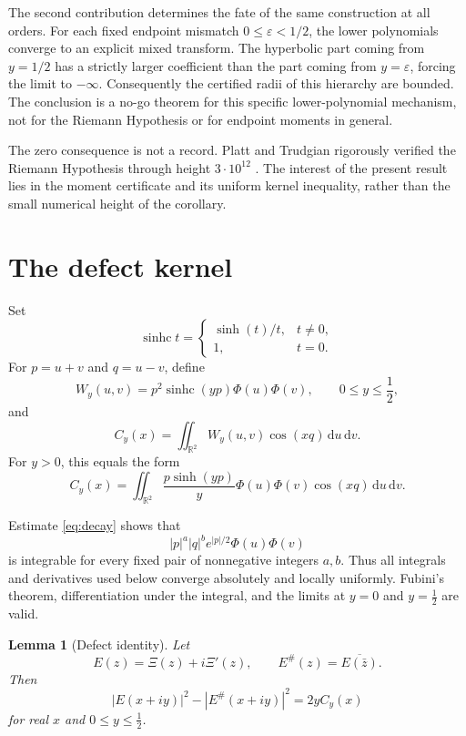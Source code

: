 \documentclass[11pt]{amsart}
\newtheorem{lemma}[theorem]{Lemma}
\theoremstyle{remark}
\newcommand{\sinhc}{\operatorname{sinhc}}
\newcommand{\R}{\mathbb{R}}
\newcommand{\dd}{\,\mathrm{d}}
\begin{document}
The second contribution determines the fate of the same construction at all
orders.  For each fixed endpoint mismatch $0\leq\varepsilon<1/2$, the lower
polynomials converge to an explicit mixed transform.  The hyperbolic part
coming from $y=1/2$ has a strictly larger coefficient than the part coming
from $y=\varepsilon$, forcing the limit to $-\infty$.  Consequently the
certified radii of this hierarchy are bounded.  The conclusion is a no-go
theorem for this specific lower-polynomial mechanism, not for the Riemann
Hypothesis or for endpoint moments in general.

The zero consequence is not a record.  Platt and Trudgian rigorously verified
the Riemann Hypothesis through height $3\cdot10^{12}$ \cite{PT2021}.  The
interest of the present result lies in the moment certificate and its uniform
kernel inequality, rather than the small numerical height of the corollary.

\section{The defect kernel}

Set
\[
\sinhc t=
\begin{cases}
\sinh(t)/t,&t\neq0,\\
1,&t=0.
\end{cases}
\]
For $p=u+v$ and $q=u-v$, define
\begin{equation}\label{eq:W}
W_y(u,v)=p^2\sinhc(yp)\Phi(u)\Phi(v),
\qquad 0\leq y\leq\frac12,
\end{equation}
and
\begin{equation}\label{eq:C}
C_y(x)=\iint_{\R^2}W_y(u,v)\cos(xq)\dd u\dd v.
\end{equation}
For $y>0$, this equals the form
\[
C_y(x)=\iint_{\R^2}
\frac{p\sinh(yp)}{y}\Phi(u)\Phi(v)\cos(xq)\dd u\dd v.
\]

Estimate \eqref{eq:decay} shows that
\[
|p|^a|q|^b e^{|p|/2}\Phi(u)\Phi(v)
\]
is integrable for every fixed pair of nonnegative integers $a,b$.  Thus all
integrals and derivatives used below converge absolutely and locally
uniformly.  Fubini's theorem, differentiation under the integral, and the
limits at $y=0$ and $y=\frac12$ are valid.

\begin{lemma}[Defect identity]\label{lem:defect}
Let
\[
E(z)=\Xi(z)+i\Xi'(z),
\qquad
E^{\#}(z)=\overline{E(\bar z)}.
\]
Then
\begin{equation}\label{eq:defect}
|E(x+iy)|^2-|E^{\#}(x+iy)|^2=2yC_y(x)
\end{equation}
for real $x$ and $0\leq y\leq\frac12$.
\end{lemma}
\end{document}
